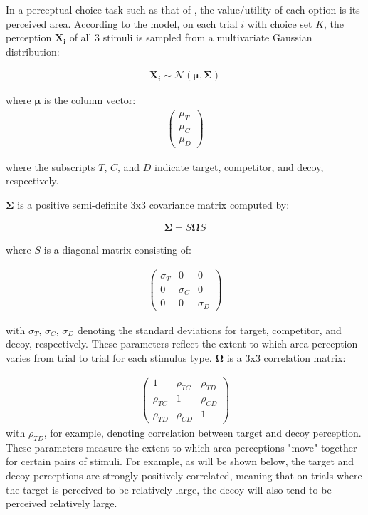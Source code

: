In a perceptual choice task such as that of \textcite{spektorWhenGoodLooks2018b}, the value/utility of each option is its perceived area. According to the model, on each trial $i$ with choice set $K$, the perception $\mathbf{X_i}$ of all $3$ stimuli is sampled from a multivariate Gaussian distribution:

\begin{align}
   \mathbf{X}_{i} \sim \mathcal{N}(\boldsymbol{\mu}, \boldsymbol{\Sigma})
   \label{eqn:mvnorm}
\end{align}

where $\boldsymbol{\mu}$ is the column vector:
\begin{align}
   \begin{pmatrix}
      \mu_{T} \\
      \mu_{C} \\
      \mu_{D}
      \end{pmatrix}
   \label{eqn:mu}
\end{align}

where the subscripts $T$, $C$, and $D$ indicate target, competitor, and decoy, respectively.

$\boldsymbol{\Sigma}$ is a positive semi-definite $3 \text{x} 3$ covariance matrix computed by:

\begin{align}
   \boldsymbol{\Sigma}=S\boldsymbol{\Omega}S
   \label{eqn:Sigma}
\end{align}

where $S$ is a diagonal matrix consisting of: 

\begin{align}
   \begin{pmatrix}
      \sigma_{T} & 0 & 0 \\
      0 & \sigma_{C} & 0 \\
      0 & 0 & \sigma_{D} 
   \end{pmatrix}
\label{eqn:S}
\end{align}

with $\sigma_{T}$, $\sigma_{C}$, $\sigma_{D}$ denoting the standard deviations for target, competitor, and decoy, respectively. These parameters reflect the extent to which area perception varies from trial to trial for each stimulus type. $\boldsymbol{\Omega}$ is a $3\text{x}3$ correlation matrix:

\begin{align}
   \begin{pmatrix}
      1 & \rho_{TC} & \rho_{TD} \\
      \rho_{TC} & 1 & \rho_{CD} \\
      \rho_{TD} & \rho_{CD} & 1 
   \end{pmatrix}
\label{eqn:O}
\end{align}
with $\rho_{TD}$, for example, denoting correlation between target and decoy perception. These parameters measure the extent to which area perceptions "move" together for certain pairs of stimuli. For example, as will be shown below, the target and decoy perceptions are strongly positively correlated, meaning that on trials where the target is perceived to be relatively large, the decoy will also tend to be perceived relatively large.

